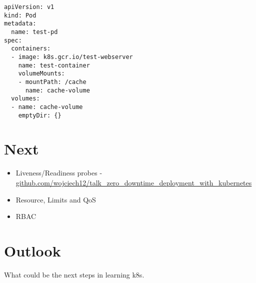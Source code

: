 \documentclass[12pt, letterpaper]{article}
\begin{document}
\begin{verbatim}
apiVersion: v1
kind: Pod
metadata:
  name: test-pd
spec:
  containers:
  - image: k8s.gcr.io/test-webserver
    name: test-container
    volumeMounts:
    - mountPath: /cache
      name: cache-volume
  volumes:
  - name: cache-volume
    emptyDir: {}
\end{verbatim}

\section{Next}

\begin{itemize}
\item Liveness/Readiness probes -\\%
\href{https://github.com/wojciech12/talk_zero_downtime_deployment_with_kubernetes}{github.com/wojciech12/talk\_zero\_downtime\_deployment\_with\_kubernetes}
\item Resource, Limits and QoS
\item {\small RBAC}
\end{itemize}

%
\section{Outlook}
What could be the next steps in learning k8s.
\end{document}
